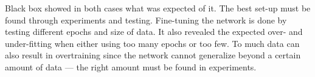 Black box showed in both cases what was expected of it. The best set-up must be found through experiments and testing. Fine-tuning the network is done by testing different epochs and size of data. It also revealed the expected over- and under-fitting when either using too many epochs or too few. To much data can also result in overtraining since the network cannot generalize beyond a certain amount of data --- the right amount must be found in experiments. 